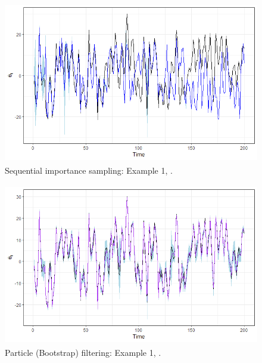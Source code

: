 \begin{enumerate}[leftmargin=*]
\begin{figure}[!h]
	\includegraphics[width=340pt, height=200pt]{Chapters/chapter5/figures/SISGordon.png}
	\caption[List of figure caption goes here]{Sequential importance sampling: Example 1, \cite{Gordon1993}.}\label{fig56}
\end{figure} 

\begin{figure}[!h]
	\includegraphics[width=340pt, height=200pt]{Chapters/chapter5/figures/PFGordon.png}
	\caption[List of figure caption goes here]{Particle (Bootstrap) filtering: Example 1, \cite{Gordon1993}.}\label{fig57}
\end{figure}


\end{enumerate}
